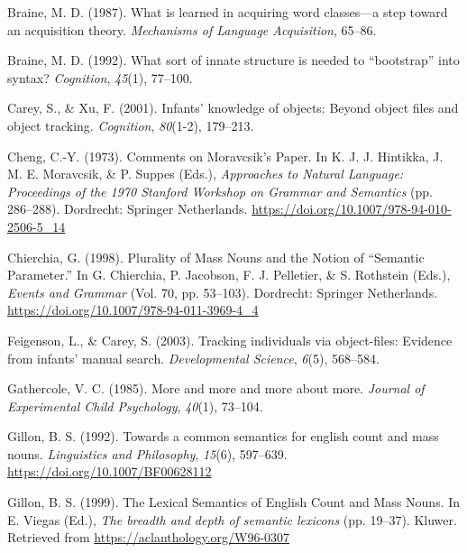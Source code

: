 \documentclass[
  man,floatsintext]{apa6}
\newlength{\cslhangindent}
\newlength{\cslentryspacingunit} %
\newenvironment{CSLReferences}[2] %
 {%
  \setlength{\parindent}{0pt}
  \ifodd #1
  \let\oldpar\par
  \def\par{\hangindent=\cslhangindent\oldpar}
  \fi
  \setlength{\parskip}{#2\cslentryspacingunit}
 }%
 {}
\begin{document}
\begin{CSLReferences}{1}{0}
\leavevmode{}%
Braine, M. D. (1987). What is learned in acquiring word classes---a step toward an acquisition theory. \emph{Mechanisms of Language Acquisition}, 65--86.

\leavevmode{}%
Braine, M. D. (1992). What sort of innate structure is needed to {``bootstrap''} into syntax? \emph{Cognition}, \emph{45}(1), 77--100.

\leavevmode{}%
Carey, S., \& Xu, F. (2001). Infants' knowledge of objects: Beyond object files and object tracking. \emph{Cognition}, \emph{80}(1-2), 179--213.

\leavevmode{}%
Cheng, C.-Y. (1973). Comments on {Moravcsik}'s {Paper}. In K. J. J. Hintikka, J. M. E. Moravcsik, \& P. Suppes (Eds.), \emph{Approaches to {Natural} {Language}: {Proceedings} of the 1970 {Stanford} {Workshop} on {Grammar} and {Semantics}} (pp. 286--288). Dordrecht: Springer Netherlands. \url{https://doi.org/10.1007/978-94-010-2506-5_14}

\leavevmode{}%
Chierchia, G. (1998). Plurality of {Mass} {Nouns} and the {Notion} of {``{Semantic} {Parameter}.''} In G. Chierchia, P. Jacobson, F. J. Pelletier, \& S. Rothstein (Eds.), \emph{Events and {Grammar}} (Vol. 70, pp. 53--103). Dordrecht: Springer Netherlands. \url{https://doi.org/10.1007/978-94-011-3969-4_4}

\leavevmode{}%
Feigenson, L., \& Carey, S. (2003). Tracking individuals via object-files: Evidence from infants' manual search. \emph{Developmental Science}, \emph{6}(5), 568--584.

\leavevmode{}%
Gathercole, V. C. (1985). More and more and more about more. \emph{Journal of Experimental Child Psychology}, \emph{40}(1), 73--104.

\leavevmode{}%
Gillon, B. S. (1992). Towards a common semantics for english count and mass nouns. \emph{Linguistics and Philosophy}, \emph{15}(6), 597--639. \url{https://doi.org/10.1007/BF00628112}

\leavevmode{}%
Gillon, B. S. (1999). The {Lexical} {Semantics} of {English} {Count} and {Mass} {Nouns}. In E. Viegas (Ed.), \emph{The breadth and depth of semantic lexicons} (pp. 19--37). Kluwer. Retrieved from \url{https://aclanthology.org/W96-0307}


\end{CSLReferences}
\end{document}
